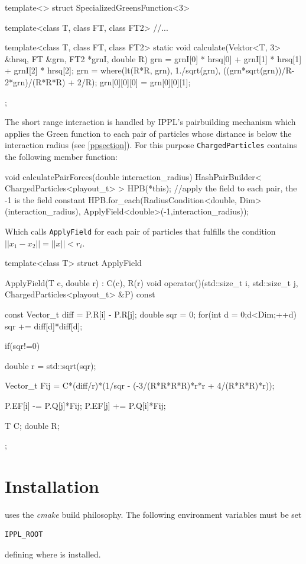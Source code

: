 \vspace{5mm}
\begin{code}
template<>
struct SpecializedGreensFunction<3> {
  template<class T, class FT, class FT2>
  //...

  template<class T, class FT, class FT2>
  static void calculate(Vektor<T, 3> &hrsq, FT &grn, FT2 *grnI, double R) {
    grn = grnI[0] * hrsq[0] + grnI[1] * hrsq[1] + grnI[2] * hrsq[2];
    grn = where(lt(R*R, grn), 1./sqrt(grn),
		((grn*sqrt(grn))/R-2*grn)/(R*R*R) + 2/R);
    grn[0][0][0] = grn[0][0][1];
  }
};
\end{code}
\vspace{5mm}
The short range interaction is handled by IPPL's pairbuilding mechanism which applies
the Green function to each pair of particles whose distance is below the
interaction radius (see \ref{ppsection}). For this purpose \texttt{ChargedParticles} contains the following member
function:


\vspace{5mm}
\begin{code}
  void calculatePairForces(double interaction_radius)
  {
    HashPairBuilder< ChargedParticles<playout_t> > HPB(*this);
    //apply the field to each pair, the -1 is the field constant
    HPB.for_each(RadiusCondition<double, Dim>(interaction_radius),
    			   ApplyField<double>(-1,interaction_radius));
  }
\end{code}
\vspace{5mm}
Which calls \texttt{ApplyField} for each pair of particles that fulfills the condition $||x_1-x_2|| = ||x|| <r_i$.
\clearpage
\pagebreak
\vspace{5mm}
\begin{code}
template<class T>
struct ApplyField {
  ApplyField(T c, double r) : C(c), R(r) {}
  void operator()(std::size_t i, std::size_t j, ChargedParticles<playout_t> &P) const
  {
    const Vector_t diff = P.R[i] - P.R[j];
    double sqr = 0;
    for(int d = 0;d<Dim;++d)
      sqr += diff[d]*diff[d];

     if(sqr!=0)
      {
	double r = std::sqrt(sqr);

	Vector_t Fij = C*(diff/r)*(1/sqr - (-3/(R*R*R*R)*r*r + 4/(R*R*R)*r));

	P.EF[i] -= P.Q[j]*Fij;
	P.EF[j] += P.Q[i]*Fij;
      }
  }
  T C;
  double R;
};
\end{code}

\section{Installation}
 \ippl uses the {\em cmake } build philosophy.  The following environment variables must be set
\begin{verbatim}
IPPL_ROOT
\end{verbatim}
defining where \ippl is installed.

